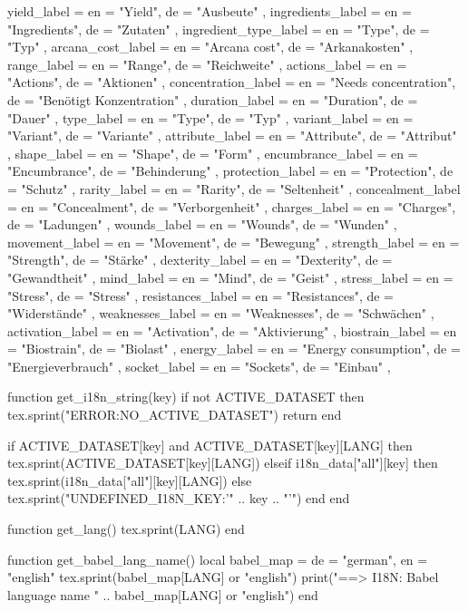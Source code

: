 \begin{luacode*}
{{        yield_label = { en = "Yield", de = "Ausbeute" },
        ingredients_label = { en = "Ingredients", de = "Zutaten" },
        ingredient_type_label = { en = "Type", de = "Typ" },
        arcana_cost_label = { en = "Arcana cost", de = "Arkanakosten" },
        range_label = { en = "Range", de = "Reichweite" },
        actions_label = { en = "Actions", de = "Aktionen" },
        concentration_label = { en = "Needs concentration", de = "Benötigt Konzentration" },
        duration_label =  { en = "Duration", de = "Dauer" },
        type_label =  { en = "Type", de = "Typ" },
        variant_label =  { en = "Variant", de = "Variante" },
        attribute_label =  { en = "Attribute", de = "Attribut" },
        shape_label = { en = "Shape", de = "Form" },
        encumbrance_label = { en = "Encumbrance", de = "Behinderung" },
        protection_label = { en = "Protection", de = "Schutz" },
        rarity_label = { en = "Rarity", de = "Seltenheit" },
        concealment_label = { en = "Concealment", de = "Verborgenheit" },
        charges_label = { en = "Charges", de = "Ladungen" },
        wounds_label = { en = "Wounds", de = "Wunden" },
        movement_label = { en = "Movement", de = "Bewegung" },
        strength_label = { en = "Strength", de = "Stärke" },
        dexterity_label = { en = "Dexterity", de = "Gewandtheit" },
        mind_label = { en = "Mind", de = "Geist" },
        stress_label = { en = "Stress", de = "Stress" },
        resistances_label = { en = "Resistances", de = "Widerstände" },
        weaknesses_label = { en = "Weaknesses", de = "Schwächen" },
        activation_label = { en = "Activation", de = "Aktivierung" },
        biostrain_label = { en = "Biostrain", de = "Biolast" },
        energy_label = { en = "Energy consumption", de = "Energieverbrauch" },
        socket_label = { en = "Sockets", de = "Einbau" },
    }
}

function get_i18n_string(key)
    if not ACTIVE_DATASET then
        tex.sprint("ERROR:NO_ACTIVE_DATASET")
        return
    end
    
    if ACTIVE_DATASET[key] and ACTIVE_DATASET[key][LANG] then
        tex.sprint(ACTIVE_DATASET[key][LANG])
    elseif i18n_data["all"][key] then
        tex.sprint(i18n_data["all"][key][LANG])
    else
        tex.sprint("UNDEFINED_I18N_KEY:'" .. key .. "'")
    end
end
\end{luacode*}
\newcommand{\trans}[1]{\directlua{get_i18n_string("#1")}}

\begin{luacode*}
function get_lang()
    tex.sprint(LANG)
end
\end{luacode*}
\newcommand{\lang}{\directlua{get_lang()}}

\begin{luacode*}
function get_babel_lang_name()
    local babel_map = { de = "german", en = "english" }
    tex.sprint(babel_map[LANG] or "english")
    print("==> I18N: Babel language name " .. babel_map[LANG] or "english")
end
\end{luacode*}

\usepackage[]{babel}

\ifstrequal{}{german}{
    \usepackage[german=guillemets]{csquotes}
    \KOMAoptions{captions=tableheading}
}{}
